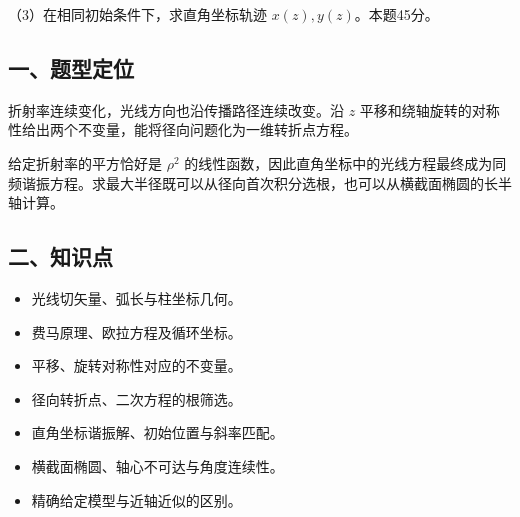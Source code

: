 \documentclass[12pt,a4paper,fontset=fandol]{ctexart}
\providecommand{\tightlist}{\setlength{\itemsep}{0pt}\setlength{\parskip}{0pt}}
\begin{document}
（3）在相同初始条件下，求直角坐标轨迹 \(x(z),y(z)\)。本题45分。

\begin{center}
\begin{minipage}{\linewidth}
\centering\begingroup
{}
\ifdim\wd\diagrambox>.88\linewidth
\sbox{\diagrambox}{\resizebox{.88\linewidth}{!}{\usebox{\diagrambox}}}
\fi
\ifdim\ht\diagrambox>.40\textheight
\resizebox{!}{.40\textheight}{\usebox{\diagrambox}}
\else\usebox{\diagrambox}\fi
\par{}
\endgroup\end{minipage}
\end{center}

\subsection{一、题型定位}\label{ux4e00ux9898ux578bux5b9aux4f4d-6}

折射率连续变化，光线方向也沿传播路径连续改变。沿 \(z\)
平移和绕轴旋转的对称性给出两个不变量，能将径向问题化为一维转折点方程。

给定折射率的平方恰好是 \(\rho^2\)
的线性函数，因此直角坐标中的光线方程最终成为同频谐振方程。求最大半径既可以从径向首次积分选根，也可以从横截面椭圆的长半轴计算。

\subsection{二、知识点}\label{ux4e8cux77e5ux8bc6ux70b9-6}

\begin{itemize}
\tightlist
\item
  光线切矢量、弧长与柱坐标几何。
\item
  费马原理、欧拉方程及循环坐标。
\item
  平移、旋转对称性对应的不变量。
\item
  径向转折点、二次方程的根筛选。
\item
  直角坐标谐振解、初始位置与斜率匹配。
\item
  横截面椭圆、轴心不可达与角度连续性。
\item
  精确给定模型与近轴近似的区别。
\end{itemize}
\end{document}
